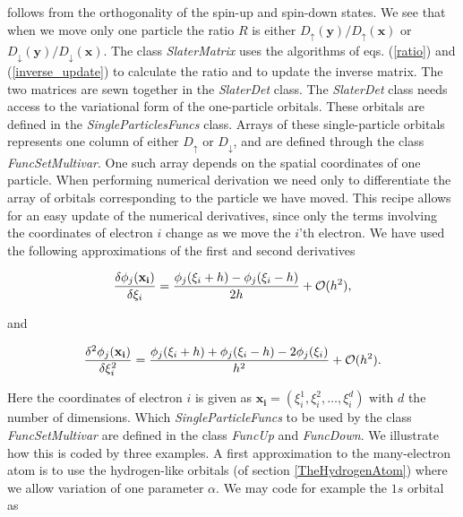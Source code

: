 follows from the orthogonality of the spin-up and spin-down states.
We see that when we move only one particle the ratio $R$ is either 
$D_{\uparrow}(\mathbf{y})/D_{\uparrow}(\mathbf{x})$ or
$D_{\downarrow}(\mathbf{y})/D_{\downarrow}(\mathbf{x})$.
\newline
%
\newline
The class \emph{SlaterMatrix} uses the algorithms of eqs.
(\ref{ratio}) and (\ref{inverse_update}) to calculate the ratio and to
update the inverse matrix. The two matrices are
sewn together in the \emph{SlaterDet} class. The \emph{SlaterDet}
class needs access to the variational form of the one-particle
orbitals. These orbitals are defined in the \emph{SingleParticlesFuncs}
class. Arrays of these single-particle orbitals represents one column
of either $D_{\uparrow}$ or $D_{\downarrow}$, and are defined through
the class \emph{FuncSetMultivar}. One such array depends on
the spatial coordinates of one particle. When performing numerical
derivation we need only to differentiate the array of orbitals
corresponding to the particle we have moved.
This recipe allows for an easy update of the numerical
derivatives, since only the terms involving the coordinates of electron
$i$ change as we move the $i$'th electron. We have used the following
approximations of the first and second derivatives

\begin{equation}
  \frac{\delta \phi_j(\mathbf{x_i})}{\delta \xi_i} = \frac{\phi_j(\xi_i+h) -
  \phi_j(\xi_i-h)}{2h} + {\cal O}(h^2),
\end{equation}

and

\begin{equation}
  \frac{\delta^2 \phi_j(\mathbf{x_i})}{\delta \xi_i^2} 
  = \frac{\phi_j(\xi_i+h) +
  \phi_j(\xi_i-h) - 2 \phi_j(\xi_i)}{h^2} + {\cal O}(h^2).
\end{equation}

Here the coordinates of electron $i$ is given as $\mathbf{x_i} =
(\xi_i^1, \xi_i^2, \dots, \xi_i^d)$ with $d$ the number of
dimensions.
\newline
%
\newline
Which \emph{SingleParticleFuncs} to be used by the class
\emph{FuncSetMultivar} are defined in the class \emph{FuncUp} and
\emph{FuncDown}. We illustrate how this is coded by three examples.
\newline
%
\newline
A first approximation to the many-electron atom is to use the
hydrogen-like orbitals (of section \ref{TheHydrogenAtom}) where we
allow variation of one parameter $\alpha$. We may code for example the
$1s$ orbital as

